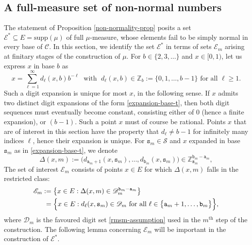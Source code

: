 \documentclass[12pt, twoside]{article}
\theoremstyle{definition}
\numberwithin{equation}{section}
\begin{document}
\subsection{A full-measure set of non-normal numbers} 
\noindent The statement of Proposition \ref{non-normality-prop} posits a set $\mathscr{E}^{\ast} \subseteq E = \text{supp}(\mu)$ of full $\mu$-measure, whose elements fail to be simply normal in every base of $\mathscr{C}$. In this section, we identify the set $\mathscr{E}^{\ast}$ in terms of sets $\mathscr{E}_m$ arising at finitary stages of the construction of $\mu$.
\vskip0.1in 
\noindent For $b \in \{2, 3, \ldots \}$ and $x \in [0,1)$, let us express $x$ in base $b$ as  
\begin{equation} 
x = \sum_{\ell=1}^{\infty} d_{\ell}(x, b) b^{-\ell} \; \text{ with } \; d_{\ell}(x, b) \in \mathbb Z_{b} := \{0, 1, \ldots, b-1\} \text{ for all } \ell \geq 1.
\label{expansion-base-t}   
\end{equation}
Such a digit expansion is unique for most $x$, in the following sense. If $x$ admits two distinct digit expansions of the form \eqref{expansion-base-t}, then both digit sequences must eventually become constant, consisting either of 0 (hence a finite expansion), or $(b-1)$. Such a point $x$ must of course be rational. Points $x$ that are of interest in this section have the property that $d_{\ell} \neq b-1$ for infinitely many indices $\ell$, hence their expansion is unique. 
\vskip0.1in 
\noindent For $\mathtt s_m \in \mathcal S$ and $x$ expanded in base $\mathtt s_m$ as in \eqref{expansion-base-t}, we denote  
\[ \Delta(x, m) := \bigl(d_{\mathtt a_m+1}(x,\mathtt s_m), \ldots, d_{\mathtt b_m}(x, \mathtt s_m) \bigr) \in \mathbb Z_{\mathtt s_m}^{\mathtt b_m - \mathtt a_m}, \]  
The set of interest $\mathscr{E}_m$ consists of points $x \in E$ for which $\Delta(x, m)$ falls in the restricted class: 
\begin{align}
   \label{Njt}
\mathscr{E}_m &:= \bigl\{x \in E: \Delta(x, m) \in \mathscr{D}_m^{\mathtt b_m - \mathtt a_m} \bigr\} \\ 
&\;= \Bigl\{x \in E : d_{\ell}(x, \mathtt s_m) \in \mathscr{D}_m  \text{ for all } \ell \in \bigl\{\mathtt a_{m}+1, \ldots, \mathtt b_{m} \bigr\} \Bigr\},  \nonumber
\end{align} 
where $\mathscr{D}_m$ is the favoured digit set \eqref{rmsm-assumption} used in the $m^{\text{th}}$ step of the construction. The following lemma concerning $\mathscr{E}_m$ will be important in the construction of $\mathscr{E}^{\ast}$.
\end{document}
